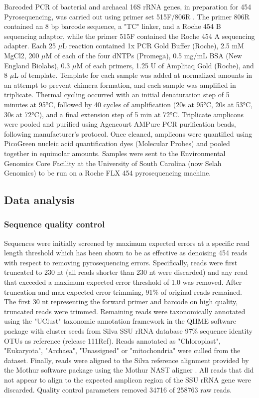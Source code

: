 Barcoded PCR of bacterial and archaeal 16S rRNA genes, in preparation for 454 Pyrosequencing, was carried out using primer set 515F/806R \citep{21349862}. The primer 806R contained an 8 bp barcode sequence, a "TC" linker, and a Roche 454 B sequencing adaptor, while the primer 515F contained the Roche 454 A sequencing adapter. Each 25 $\mu$L reaction contained 1x PCR Gold Buffer (Roche), 2.5 mM MgCl2, 200 $\mu$M of each of the four dNTPs (Promega), 0.5 mg/mL BSA (New England Biolabs), 0.3 $\mu$M of each primers, 1.25 U of Amplitaq Gold (Roche), and 8 $\mu$L of template. Template for each sample was added at normalized amounts in an attempt to prevent chimera formation, and each sample was amplified in triplicate. Thermal cycling occurred with an initial denaturation step of 5 minutes at 95°C, followed by 40 cycles of amplification (20s at 95°C, 20s at 53°C, 30s at 72°C), and a final extension step of 5 min at 72°C. Triplicate amplicons were pooled and purified using Agencourt AMPure PCR purification beads, following manufacturer’s protocol. Once cleaned, amplicons were quantified using PicoGreen nucleic acid quantification dyes (Molecular Probes) and pooled together in equimolar amounts. Samples were sent to the Environmental Genomics Core Facility at the University of South Carolina (now Selah Genomics) to be run on a Roche FLX 454 pyrosequencing machine. 

\subsection{Data analysis} 

\subsubsection{Sequence quality control} Sequences were initially screened by maximum expected errors at a specific read length threshold \citep{23955772} which has been shown to be as effective as denoising 454 reads with respect to removing pyrosequencing errors. Specifically, reads were first truncated to 230 nt (all reads shorter than 230 nt were discarded) and any read that exceeded a maximum expected error threshold of 1.0 was removed. After truncation and max expected error trimming, 91\% of original reads remained. The first 30 nt representing the forward primer and barcode on high quality, truncated reads were trimmed. Remaining reads were taxonomically annotated using the "UClust" taxonomic annotation framework in the QIIME software package \citep{20383131, 20709691} with cluster seeds from Silva SSU rRNA database \citep{17947321} 97\% sequence identity OTUs as reference (release 111Ref). Reads annotated as "Chloroplast", "Eukaryota", "Archaea", "Unassigned" or "mitochondria" were culled from the dataset. Finally, reads were aligned to the Silva reference alignment provided by the Mothur software package \citep{19801464} using the Mothur NAST aligner \citep{16845035}. All reads that did not appear to align to the expected amplicon region of the SSU rRNA gene were discarded. Quality control parameters removed 34716 of 258763 raw reads.

